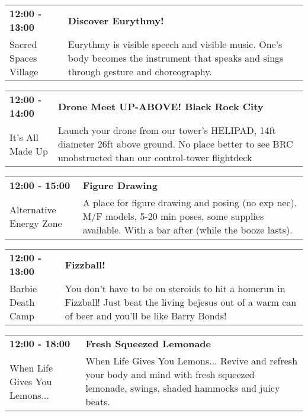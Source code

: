 \begin{tabular}{ p{1in} p{2.2in} }
    \textbf{12:00 - 13:00} & \textbf{Discover Eurythmy!} \\
    Sacred Spaces Village \newline  & Eurythmy is visible speech and visible music. One's body becomes the instrument that speaks and sings through gesture and choreography. \\
    \hline 
\end{tabular}
    
\begin{tabular}{ p{1in} p{2.2in} }
    \textbf{12:00 - 14:00} & \textbf{Drone Meet UP-ABOVE! Black Rock City} \\
    It's All Made Up \newline  & Launch your drone from our tower's HELIPAD, 14ft diameter 26ft above ground. No place better to see BRC unobstructed than our control-tower flightdeck \\
    \hline 
\end{tabular}
    
\begin{tabular}{ p{1in} p{2.2in} }
    \textbf{12:00 - 15:00} & \textbf{Figure Drawing} \\
    Alternative Energy Zone \newline  & A place for figure drawing and posing (no exp nec).  M/F models, 5-20 min poses, some supplies available. With a bar after (while the booze lasts). \\
    \hline 
\end{tabular}
    
\begin{tabular}{ p{1in} p{2.2in} }
    \textbf{12:00 - 13:00} & \textbf{Fizzball!} \\
    Barbie Death Camp \newline  & You don't have to be on steroids to hit a homerun in Fizzball!  Just beat the living bejesus out of a warm can of beer and you'll be like Barry Bonds! \\
    \hline 
\end{tabular}
    
\begin{tabular}{ p{1in} p{2.2in} }
    \textbf{12:00 - 18:00} & \textbf{Fresh Squeezed Lemonade} \\
    When Life Gives You Lemons... \newline  & When Life Gives You Lemons... Revive and refresh your body and mind with fresh squeezed lemonade, swings, shaded hammocks and juicy beats. \\
    \hline 
\end{tabular}
    
